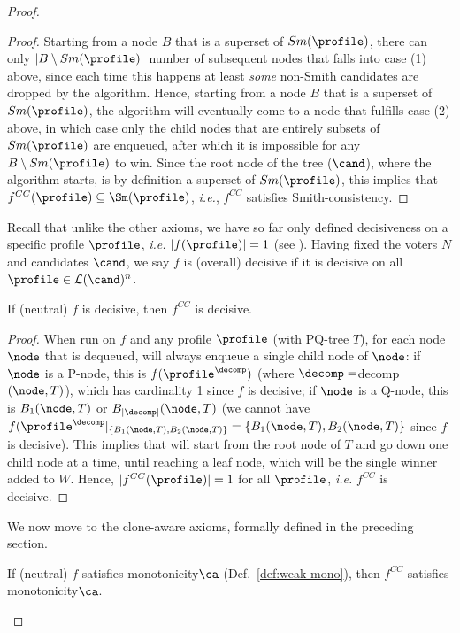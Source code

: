\begin{proof}
\begin{proof}
Starting from a node $B$ that is a superset of $Sm(\profile)$, there can only $|B\setminus Sm(\profile)|$ number of subsequent nodes that falls into case (1) above, since each time this happens at least \emph{some} non-Smith candidates are dropped by the algorithm. Hence, starting from a node $B$ that is a superset of $Sm(\profile)$, the algorithm will eventually come to a node that fulfills case (2) above, in which case only the child nodes that are entirely subsets of $Sm(\profile)$ are enqueued, after which it is impossible for any $B\setminus Sm(\profile)$ to win. Since the root node of the tree ($\cand$), where the algorithm starts, is by definition a superset of $Sm(\profile)$, this implies that $f^{CC} (\profile) \subseteq \Sm(\profile)$, \emph{i.e.}, $f^{CC}$ satisfies Smith-consistency. 
\end{proof}

Recall that unlike the other axioms, we have so far only defined decisiveness on a specific profile $\profile$, \emph{i.e.} $|f(\profile)|=1$ (see ). Having fixed the voters $N$ and candidates $\cand$, we say $f$ is (overall) decisive if it is decisive on all $\profile\in \mathcal{L}(\cand)^n$. 
\begin{lemma}\label{lemma:cc_decisive}
If (neutral) $f$ is decisive, then $f^{CC}$ is decisive. 
\end{lemma}
\begin{proof}
When run on $f$ and any profile $\profile$ (with PQ-tree $T$), for each node $\node$ that is dequeued,  will always enqueue a single child node of  $\node$: if $\node$ is a P-node, this is $f(\profile^\decomp)$ (where $\decomp =$decomp$(\node,T)$), which has cardinality 1 since $f$ is decisive; if $\node$ is a Q-node, this is $B_1(\node,T)$ or $B_{|\decomp|}(\node,T)$ (we cannot have $f(\profile^\decomp|_{\{B_1(\node,T),B_2(\node,T)\}}=\{B_1(\node,T),B_2(\node,T)\}$ since $f$ is decisive). This implies that  will start from the root node of $T$ and go down one child node at a time, until reaching a leaf node, which will be the single winner added to $W$. Hence, $|f^{CC}(\profile)|=1$ for all $\profile$, \emph{i.e.} $f^{CC}$ is decisive.
\end{proof}
We now move to the clone-aware axioms, formally defined in the preceding section.

\begin{lemma}\label{lemma:cc_mono}
If (neutral) $f$ satisfies monotonicity$\ca$  (Def.~\ref{def:weak-mono}), then $f^{CC}$ satisfies monotonicity$\ca$. 
\end{lemma}


\end{proof}
